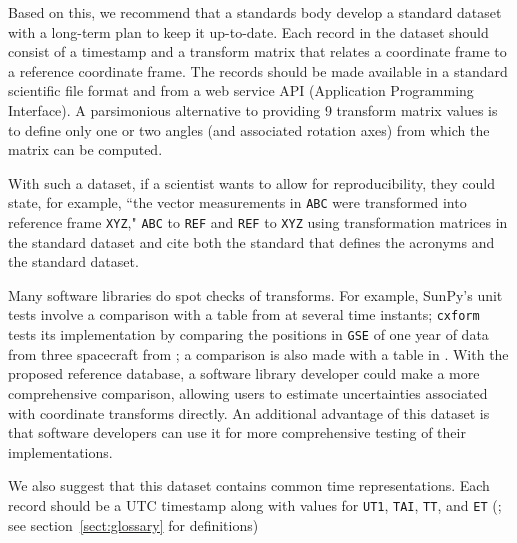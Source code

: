 \documentclass[draft]{agujournal2019}
\begin{document}
Based on this, we recommend that a standards body develop a standard dataset with a long-term plan to keep it up-to-date. Each record in the dataset should consist of a timestamp and a transform matrix that relates a coordinate frame to a reference coordinate frame. The records should be made available in a standard scientific file format and from a web service API (Application Programming Interface). A parsimonious alternative to providing 9 transform matrix values is to define only one or two angles (and associated rotation axes) from which the matrix can be computed.

With such a dataset, if a scientist wants to allow for reproducibility, they could state, for example, ``the vector measurements in \texttt{ABC} were transformed into reference frame \texttt{XYZ}," \texttt{ABC} to \texttt{REF} and \texttt{REF} to \texttt{XYZ} using transformation matrices in the standard dataset and cite both the standard that defines the acronyms and the standard dataset.

Many software libraries do spot checks of transforms. For example, SunPy's unit tests \cite{SunPy} involve a comparison with a table from  at several time instants; \texttt{cxform} \cite{cxform} tests its implementation by comparing the positions in \texttt{GSE} of one year of data from three spacecraft from ; a comparison is also made with a table in . With the proposed reference database, a software library developer could make a more comprehensive comparison, allowing users to estimate uncertainties associated with coordinate transforms directly. An additional advantage of this dataset is that software developers can use it for more comprehensive testing of their implementations.

We also suggest that this dataset contains common time representations. Each record should be a UTC timestamp along with values for \texttt{UT1}, \texttt{TAI}, \texttt{TT}, and \texttt{ET} (; see section~\ref{sect:glossary} for definitions) 


\end{document}
